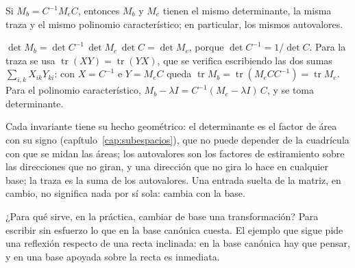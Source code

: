\begin{proposicion}\label{prop:cb-invariantes}
Si \(M_b=C^{-1}M_eC\), entonces \(M_b\) y \(M_e\) tienen el mismo determinante, la misma traza
y el mismo polinomio característico; en particular, los mismos autovalores.
\end{proposicion}

\begin{demostracion}
\(\det M_b=\det C^{-1}\,\det M_e\,\det C=\det M_e\), porque \(\det C^{-1}=1/\det C\). Para la
traza se usa \(\operatorname{tr}(XY)=\operatorname{tr}(YX)\), que se verifica escribiendo las
dos sumas \(\sum_{i,k}X_{ik}Y_{ki}\): con \(X=C^{-1}\) e \(Y=M_eC\) queda
\(\operatorname{tr}M_b=\operatorname{tr}(M_eCC^{-1})=\operatorname{tr}M_e\). Para el
polinomio característico, \(M_b-\lambda I=C^{-1}(M_e-\lambda I)\,C\), y se toma determinante.
\end{demostracion}

Cada invariante tiene su hecho geométrico: el determinante es el factor de área con su signo
(capítulo~\ref{cap:subespacios}), que no puede depender de la cuadrícula con que se midan las
áreas; los autovalores son los factores de estiramiento sobre las direcciones que no giran, y
una dirección que no gira lo hace en cualquier base; la traza es la suma de los autovalores.
Una entrada suelta de la matriz, en cambio, no significa nada por sí sola: cambia con la base.

¿Para qué sirve, en la práctica, cambiar de base una transformación? Para escribir sin esfuerzo
lo que en la base canónica cuesta. El ejemplo que sigue pide una reflexión respecto de una recta
inclinada: en la base canónica hay que pensar, y en una base apoyada sobre la recta es
inmediata.

